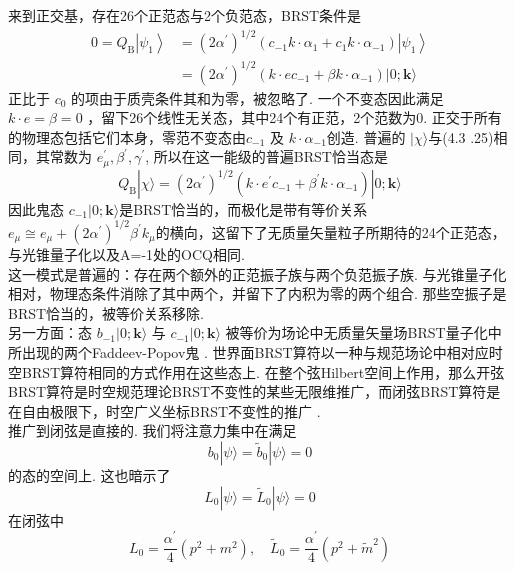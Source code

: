 来到正交基，存在26个正范态与2个负范态，BRST条件是
\begin{equation}
\begin{aligned}
0=Q_{\mathrm{B}}\left|\psi_{1}\right\rangle &=\left(2 \alpha^{\prime}\right)^{1 / 2}\left(c_{-1} k \cdot \alpha_{1}+c_{1} k \cdot \alpha_{-1}\right)\left|\psi_{1}\right\rangle \\
&=\left(2 \alpha^{\prime}\right)^{1 / 2}\left(k \cdot e c_{-1}+\beta k \cdot \alpha_{-1}\right)|0 ; \mathbf{k}\rangle
\end{aligned}
\end{equation}
正比于 $c_{0}$ 的项由于质壳条件其和为零，被忽略了.  一个不变态因此满足$k \cdot e=\beta=0 $ ，留下26个线性无关态，其中24个有正范，2个范数为0. 正交于所有的物理态包括它们本身，零范不变态由$c_{-1}$ 及 $k \cdot \alpha_{-1}$创造. 普遍的 $|\chi\rangle$与(4.3 .25)相同，其常数为 $e_{\mu}^{\prime}, \beta^{\prime}, \gamma^{\prime}$, 所以在这一能级的普遍BRST恰当态是
\begin{equation}
Q_{\mathrm{B}}|\chi\rangle=\left(2 \alpha^{\prime}\right)^{1 / 2}\left(k \cdot e^{\prime} c_{-1}+\beta^{\prime} k \cdot \alpha_{-1}\right)|0 ; \mathbf{k}\rangle
\end{equation}
因此鬼态 $c_{-1}|0 ; \mathbf{k}\rangle$是BRST恰当的，而极化是带有等价关系$e_{\mu} \cong e_{\mu}+\left(2 \alpha^{\prime}\right)^{1 / 2} \beta^{\prime} k_{\mu} $的横向，这留下了无质量矢量粒子所期待的24个正范态，与光锥量子化以及A=-1处的OCQ相同.\\
这一模式是普遍的：存在两个额外的正范振子族与两个负范振子族. 与光锥量子化相对，物理态条件消除了其中两个，并留下了内积为零的两个组合. 那些空振子是BRST恰当的，被等价关系移除.\\
另一方面：态 $b_{-1}|0 ; \mathbf{k}\rangle$ 与 $c_{-1}|0 ; \mathbf{k}\rangle$ 被等价为场论中无质量矢量场BRST量子化中所出现的两个Faddeev-Popov鬼 . 世界面BRST算符以一种与规范场论中相对应时空BRST算符相同的方式作用在这些态上.  在整个弦Hilbert空间上作用，那么开弦BRST算符是时空规范理论BRST不变性的某些无限维推广，而闭弦BRST算符是在自由极限下，时空广义坐标BRST不变性的推广 .\\
推广到闭弦是直接的. 我们将注意力集中在满足
\begin{equation}
b_{0}|\psi\rangle=\tilde{b}_{0}|\psi\rangle=0
\end{equation}
的态的空间上. 这也暗示了
\begin{equation}
L_{0}|\psi\rangle=\tilde{L}_{0}|\psi\rangle=0
\end{equation}
在闭弦中
\begin{equation}
L_{0}=\frac{\alpha^{\prime}}{4}\left(p^{2}+m^{2}\right), \quad \tilde{L}_{0}=\frac{\alpha^{\prime}}{4}\left(p^{2}+\tilde{m}^{2}\right)
\end{equation}
